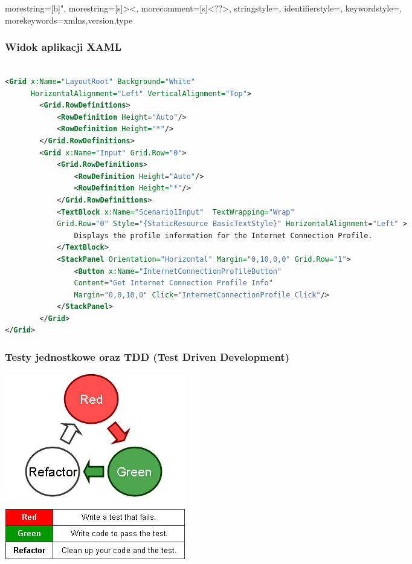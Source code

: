 {
  morestring=[b]",
  morestring=[s]{>}{<},
  morecomment=[s]{<?}{?>},
  stringstyle=\color{black},
  identifierstyle=\color{darkblue},
  keywordstyle=\color{cyan},
  morekeywords={xmlns,version,type}%
}

\begin{frame}[fragile]
\frametitle{Widok aplikacji XAML}
 \begin{adjustbox}{width=\textwidth}
\begin{lstlisting}[language=XML,basicstyle=\ttfamily]

<Grid x:Name="LayoutRoot" Background="White" 
      HorizontalAlignment="Left" VerticalAlignment="Top"> 
        <Grid.RowDefinitions> 
            <RowDefinition Height="Auto"/> 
            <RowDefinition Height="*"/> 
        </Grid.RowDefinitions> 
        <Grid x:Name="Input" Grid.Row="0"> 
            <Grid.RowDefinitions> 
                <RowDefinition Height="Auto"/> 
                <RowDefinition Height="*"/> 
            </Grid.RowDefinitions> 
            <TextBlock x:Name="Scenario1Input"  TextWrapping="Wrap" 
            Grid.Row="0" Style="{StaticResource BasicTextStyle}" HorizontalAlignment="Left" > 
                Displays the profile information for the Internet Connection Profile. 
            </TextBlock> 
            <StackPanel Orientation="Horizontal" Margin="0,10,0,0" Grid.Row="1"> 
                <Button x:Name="InternetConnectionProfileButton" 
                Content="Get Internet Connection Profile Info" 
                Margin="0,0,10,0" Click="InternetConnectionProfile_Click"/> 
            </StackPanel> 
        </Grid> 
</Grid> 
\end{lstlisting}
\end{adjustbox}
\end{frame}


\begin{frame}[fragile]
\frametitle{Testy jednostkowe oraz TDD (Test Driven Development)}
\includegraphics[scale=0.5]{tdd_cycle}
\end{frame}